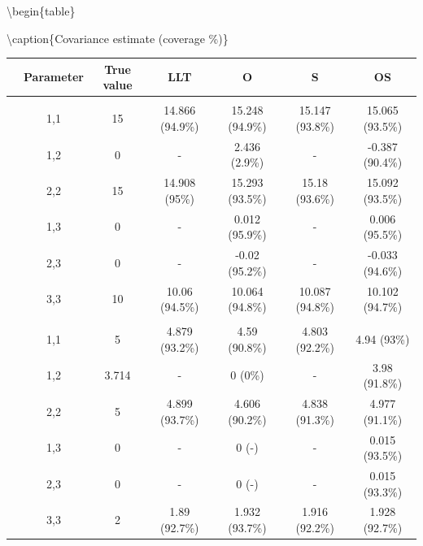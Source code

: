 \documentclass[
]{article}
\begin{document}
\textbackslash begin\{table\}

\textbackslash caption\{\label{tab:unnamed-chunk-27}Covariance estimate (coverage \%)\}
\centering

\begin{tabular}[t]{ccccccc}
\toprule
 & Parameter & True value & LLT & O & S & OS\\
\midrule
\addlinespace[0.3em]
\multicolumn{7}{l}{\textbf{Observation Error}}\\
\hspace{1em} & 1,1 & 15 & 14.866 (94.9\%) & 15.248 (94.9\%) & 15.147 (93.8\%) & 15.065 (93.5\%)\\
\cmidrule{2-7}
\hspace{1em} & 1,2 & 0 & - & 2.436 (2.9\%) & - & -0.387 (90.4\%)\\
\cmidrule{2-7}
\hspace{1em} & 2,2 & 15 & 14.908 (95\%) & 15.293 (93.5\%) & 15.18 (93.6\%) & 15.092 (93.5\%)\\
\cmidrule{2-7}
\hspace{1em} & 1,3 & 0 & - & 0.012 (95.9\%) & - & 0.006 (95.5\%)\\
\cmidrule{2-7}
\hspace{1em} & 2,3 & 0 & - & -0.02 (95.2\%) & - & -0.033 (94.6\%)\\
\cmidrule{2-7}
\hspace{1em} & 3,3 & 10 & 10.06 (94.5\%) & 10.064 (94.8\%) & 10.087 (94.8\%) & 10.102 (94.7\%)\\
\cmidrule{1-7}
\addlinespace[0.3em]
\multicolumn{7}{l}{\textbf{State Process}}\\
\hspace{1em} & 1,1 & 5 & 4.879 (93.2\%) & 4.59 (90.8\%) & 4.803 (92.2\%) & 4.94 (93\%)\\
\cmidrule{2-7}
\hspace{1em} & 1,2 & 3.714 & - & 0 (0\%) & - & 3.98 (91.8\%)\\
\cmidrule{2-7}
\hspace{1em} & 2,2 & 5 & 4.899 (93.7\%) & 4.606 (90.2\%) & 4.838 (91.3\%) & 4.977 (91.1\%)\\
\cmidrule{2-7}
\hspace{1em} & 1,3 & 0 & - & 0 (-) & - & 0.015 (93.5\%)\\
\cmidrule{2-7}
\hspace{1em} & 2,3 & 0 & - & 0 (-) & - & 0.015 (93.3\%)\\
\cmidrule{2-7}
\hspace{1em} & 3,3 & 2 & 1.89 (92.7\%) & 1.932 (93.7\%) & 1.916 (92.2\%) & 1.928 (92.7\%)\\
\bottomrule
\end{tabular}
\end{document}
